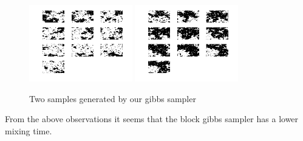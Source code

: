 \documentclass[10pt,onecolumn,letterpaper]{article}
\begin{document}
\begin{figure}[htbp]
  \centering
    \includegraphics[width=0.4\textwidth]{Images/gibbs_sampler_1.png}
    \hfill
	\includegraphics[width=0.4\textwidth]{Images/gibbs_sampler_2.png}
    \caption{Two samples generated by our gibbs sampler} 
\end{figure}

From the above observations it seems that the block gibbs sampler has a lower mixing time.
\end{document}
